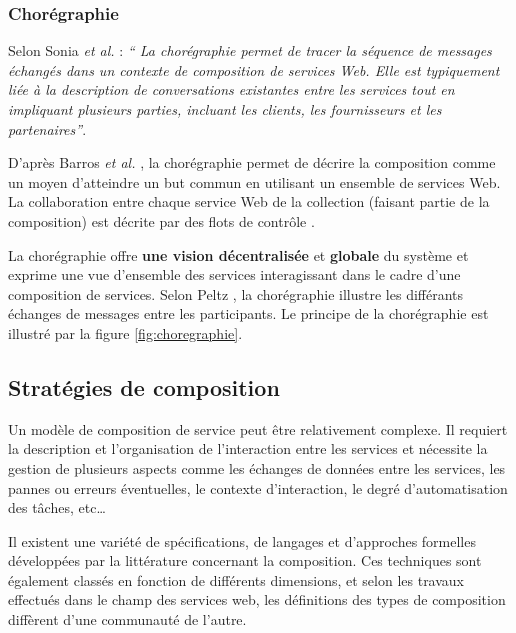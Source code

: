       \subsubsection{Chorégraphie}
      \label{sec:choregraphie-sec}
      Selon Sonia \emph{et al.} \cite{jamal2005environnement} :
      \emph{`` La chorégraphie permet de tracer la séquence de
        messages échangés dans un contexte de composition de services
        Web. Elle est typiquement liée à la description de
        conversations existantes entre les services tout en impliquant
        plusieurs parties, incluant les clients, les fournisseurs et
        les partenaires''}.

      D'après Barros \emph{et al.} \cite{barros2006standards}, la
      chorégraphie permet de décrire la composition comme un moyen
      d'atteindre un but commun en utilisant un ensemble de services
      Web. La collaboration entre chaque service Web de la collection
      (faisant partie de la composition) est décrite par des flots de
      contrôle \cite{lopez2008selection}.

      La chorégraphie offre \textbf{une vision décentralisée} et
      \textbf{globale} du système et exprime une vue d'ensemble des
      services interagissant dans le cadre d'une composition de
      services. Selon Peltz \cite{peltz2003web}, la chorégraphie
      illustre les différants échanges de messages entre les
      participants. Le principe de la chorégraphie est illustré par la
      figure \ref{fig:choregraphie}.

    \subsection{Stratégies de composition}
    \label{sec:types-de-composition}
    Un modèle de composition de service peut être relativement
    complexe. Il requiert la description et l'organisation de
    l'interaction entre les services et nécessite la gestion de
    plusieurs aspects comme les échanges de données entre les
    services, les pannes ou erreurs éventuelles, le contexte
    d'interaction, le degré d'automatisation des tâches, etc\dots
    
    Il existent une variété de spécifications, de langages et
    d'approches formelles développées par la littérature concernant la
    composition. Ces techniques sont également classés en fonction de
    différents dimensions, et selon les travaux effectués dans le
    champ des services web, les définitions des types de composition
    diffèrent d'une communauté de l'autre.
 
